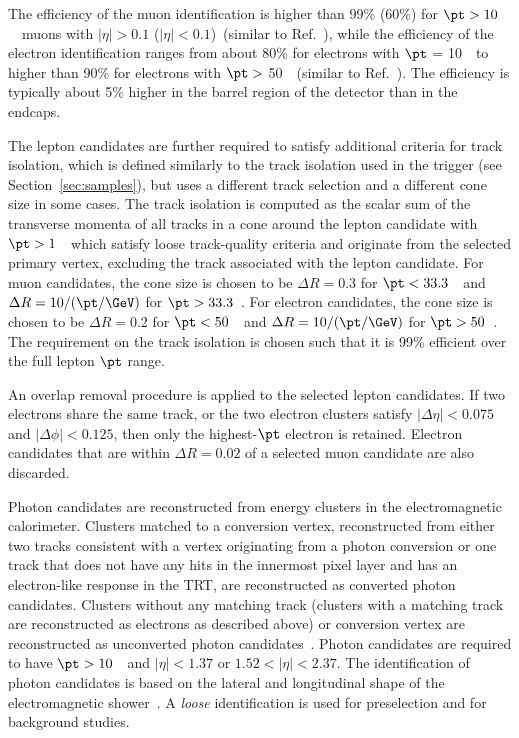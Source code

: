 The efficiency of the muon identification is higher than 99\% (60\%) for $\pt> 10$~\GeV\ muons with 
$|\eta|>0.1$ ($|\eta|<0.1$)~(similar to Ref.~\cite{Aad:2016jkr}), while
the efficiency of the electron identification ranges from about 80\% for electrons with 
$\pt$ = 10~\GeV\ to higher than 90\% for electrons with $\pt >$ 50~\GeV\
(similar to Ref.~\cite{ATLAS-electrons}). 
The efficiency is typically
about 5\% higher in the barrel region of the detector than in the endcaps.

The lepton candidates are further required to satisfy additional criteria for track isolation, 
which is defined similarly to the track isolation used in the trigger (see Section~\ref{sec:samples}),
but uses a different track selection and 
a different cone size in some cases.
The track isolation is computed
as the scalar sum of the transverse momenta of all tracks in a cone around the 
lepton candidate with $\pt > 1$~\GeV\ which satisfy loose track-quality criteria and originate from the 
selected primary vertex, excluding the track associated with the lepton candidate. For muon candidates, 
the cone size is chosen to be $\Delta R = 0.3$ for $\pt < 33.3$~\GeV\ and 
$\Delta R = 10 / (\pt/\GeV)$ for $\pt > 33.3$~\GeV. For electron candidates,
the cone size is chosen to be $\Delta R = 0.2$ for $\pt < 50$~\GeV\ and 
$\Delta R = 10 / (\pt/\GeV)$ for $\pt > 50$~\GeV. The requirement
on the track isolation is chosen such that it is 99\% efficient over the full lepton $\pt$ range.

An overlap removal procedure is applied to the selected lepton candidates. 
If two electrons share the same track, or the two electron clusters 
satisfy $|\Delta\eta| < 0.075$ and $|\Delta\phi| < 0.125$, then only the highest-$\pt$ electron
is retained. Electron candidates that are within 
$\Delta R = 0.02$ of a selected muon candidate are also discarded.

Photon candidates are reconstructed from energy clusters in the electromagnetic 
calorimeter. 
Clusters matched to a conversion vertex, reconstructed from either two tracks consistent with a 
vertex originating from a photon conversion or one track that does not have any hits in the innermost 
pixel layer and has an electron-like response in the TRT, are reconstructed as converted photon candidates. 
Clusters without any matching track (clusters with a matching track are reconstructed as electrons
as described above) or conversion vertex are reconstructed as unconverted photon 
candidates~\cite{Aaboud:2016yuq}.
Photon candidates are required to have $\pt > 10$~\GeV\ and $|\eta|<1.37$ or 
$1.52<|\eta|<2.37$. 
The identification of photon candidates is based on the lateral and longitudinal shape of the 
electromagnetic shower~\cite{Aaboud:2016yuq,ATLAS-photonid}. A \textit{loose} identification is used for preselection
and for background studies.

